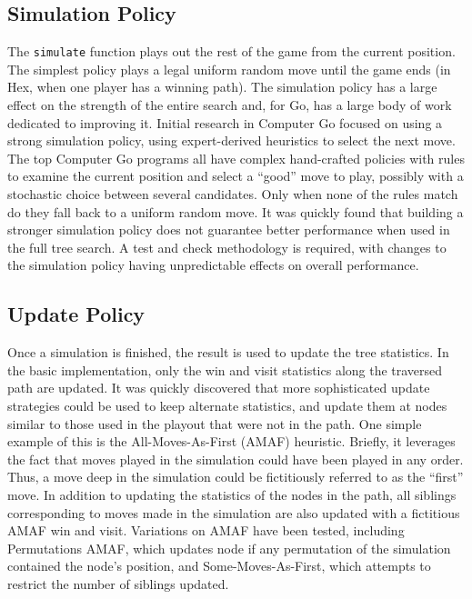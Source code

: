 \documentclass[11pt]{report}
\begin{document}
\subsection{Simulation Policy}
The \texttt{simulate} function plays out the rest of the game from the current position. The simplest policy plays a legal uniform random move until the game ends (in Hex, when one player has a winning path). The simulation policy has a large effect on the strength of the entire search and, for Go, has a large body of work dedicated to improving it.
Initial research in Computer Go focused on using a strong simulation policy, using expert-derived heuristics to select the next move\cite{chaslot2010adding}. The top Computer Go programs all have complex hand-crafted policies with rules to examine the current position and select a ``good'' move to play, possibly with a stochastic choice between several candidates. Only when none of the rules match do they fall back to a uniform random move. It was quickly found that building a stronger simulation policy does not guarantee better performance when used in the full tree search\cite{gelly2006modification}. A test and check methodology is required, with changes to the simulation policy having unpredictable effects on overall performance.

\subsection{Update Policy}
Once a simulation is finished, the result is used to update the tree statistics. In the basic implementation, only the win and visit statistics along the traversed path are updated. It was quickly discovered that more sophisticated update strategies could be used to keep alternate statistics, and update them at nodes similar to those used in the playout that were not in the path. One simple example of this is the All-Moves-As-First (AMAF) heuristic. Briefly, it leverages the fact that moves played in the simulation could have been played in any order. Thus, a move deep in the simulation could be fictitiously referred to as the ``first'' move. In addition to updating the statistics of the nodes in the path, all siblings corresponding to moves made in the simulation are also updated with a fictitious AMAF win and visit. Variations on AMAF have been tested, including Permutations AMAF, which updates node if any permutation of the simulation contained the node's position, and Some-Moves-As-First, which attempts to restrict the number of siblings updated.
\end{document}
